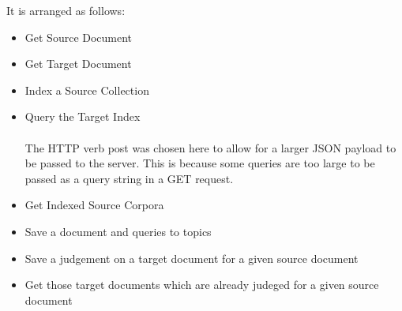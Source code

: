  It is arranged as follows:
\begin{itemize}
\item Get Source Document \\
\item Get Target Document \\
\item Index a Source Collection \\
\item Query the Target Index \\
 \\
The HTTP verb post was chosen here to allow for a larger JSON payload to be passed to the server. This is because some queries are too large to be passed as a query string in a GET request.
\item Get Indexed Source Corpora \\
\item Save a document and queries to topics \\
\item Save a judgement on a target document for a given source document \\
\item Get those target documents which are already judeged for a given source document \\
\end{itemize}
